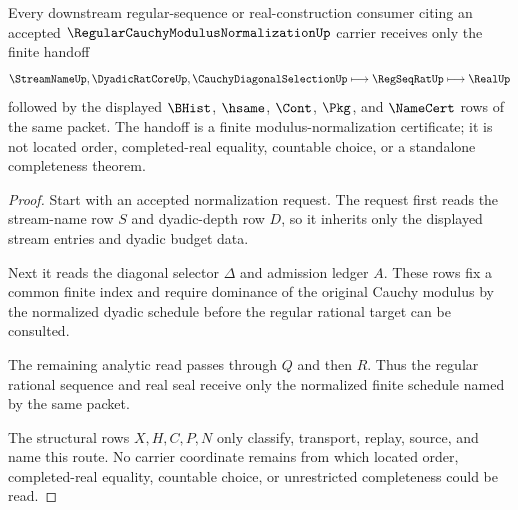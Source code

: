 \begin{theorem}
\label{thm:regular-cauchy-modulus-normalization-handoff}
Every downstream regular-sequence or real-construction consumer citing an accepted $\RegularCauchyModulusNormalizationUp$ carrier receives only the finite handoff
$$
\StreamNameUp,\DyadicRatCoreUp,\CauchyDiagonalSelectionUp \longmapsto \RegSeqRatUp \longmapsto \RealUp
$$
followed by the displayed $\BHist$, $\hsame$, $\Cont$, $\Pkg$, and $\NameCert$ rows of the same packet. The handoff is a finite modulus-normalization certificate; it is not located order, completed-real equality, countable choice, or a standalone completeness theorem.
\end{theorem}
\begin{proof}
Start with an accepted normalization request. The request first reads the stream-name row $S$ and dyadic-depth row $D$, so it inherits only the displayed stream entries and dyadic budget data.

Next it reads the diagonal selector $\Delta$ and admission ledger $A$. These rows fix a common finite index and require dominance of the original Cauchy modulus by the normalized dyadic schedule before the regular rational target can be consulted.

The remaining analytic read passes through $Q$ and then $R$. Thus the regular rational sequence and real seal receive only the normalized finite schedule named by the same packet.

The structural rows $X,H,C,P,N$ only classify, transport, replay, source, and name this route. No carrier coordinate remains from which located order, completed-real equality, countable choice, or unrestricted completeness could be read.
\end{proof}

